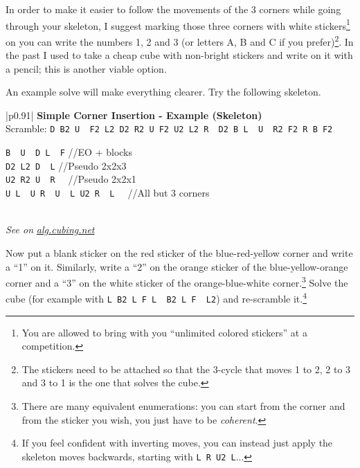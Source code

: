 \documentclass[11pt,a4paper]{book}
\newcommand{\p}{\textquotesingle}
\newcommand{\m}{\texttt}
\newcommand{\ps}{\p\,\,}
\newcommand{\comment}[1]{{\color{gray}\quad//#1}}
\begin{document}
In order to make it easier to follow the movements of the 3 corners while going through your skeleton, I suggest marking those three corners with white stickers\footnote{You are allowed to bring with you “unlimited colored stickers” at a competition.} on you can write the numbers 1, 2 and 3 (or letters A, B and C if you prefer)\footnote{The stickers need to be attached so that the 3-cycle that moves 1 to 2, 2 to 3 and 3 to 1 is the one that solves the cube.}. In the past I used to take a cheap cube with non-bright stickers and write on it with a pencil; this is another viable option.

An example solve will make everything clearer. Try the following skeleton.

\bigskip
\begin{tabular}{|p{}|}
\hline
\textbf{Simple Corner Insertion - Example (Skeleton)}\\
\hline
Scramble: \m{D B2 U\ps F2 L2 D2 R2 U F2 U2 L2 R\ps D2 B L\ps U\ps R2 F2 R B F2}\\
\hline
\begin{minipage}[l]{0.650\textwidth}
\m{B\ps U\ps D L\ps F\p} \comment{EO + blocks}\\
\m{D2 L2 D\ps L} \comment{Pseudo 2x2x3}\\
\m{U2 R2 U\ps R\ps} \comment{Pseudo 2x2x1}\\
\m{U L\ps U R\ps U\ps L U2 R\ps L\ps} \comment{All but 3 corners}
\end{minipage}
\begin{minipage}[c]{0.25\textwidth}

\end{minipage}\\
\hline
\emph{See on }\href{https://alg.cubing.net/?setup=D_B2_U-_F2_L2_D2_R2_U_F2_U2_L2_R-_D2_B_L-_U-_R2_F2_R_B_F2&alg=B-_U-_D_L-_F-_\%2F\%2FEO_\%26\%232b\%3B_blocks\%0AD2_L2_D-_L_\%2F\%2FPseudo1_2x2x3\%0AU2_R2_U-_R-_\%2F\%2FPseudo_2x2x1\%0AU_L-_U_R-_U-_L_U2_R-_L-_\%2F\%2FAll_but_3_corners}{\emph{alg.cubing.net}}\\
\hline
\end{tabular}
\bigskip

Now put a blank sticker on the red sticker of the blue-red-yellow corner and write a ``1'' on it. Similarly, write a ``2'' on the orange sticker of the blue-yellow-orange corner and a ``3'' on the white sticker of the orange-blue-white corner.\footnote{There are many equivalent enumerations: you can start from the corner and from the sticker you wish, you just have to be \emph{coherent}.} Solve the cube (for example with \m{L B2 L F L\ps B2 L F\ps L2}) and re-scramble it.\footnote{If you feel confident with inverting moves, you can instead just apply the skeleton moves backwards, starting with \m{L R U2 L\p}...}
\end{document}
